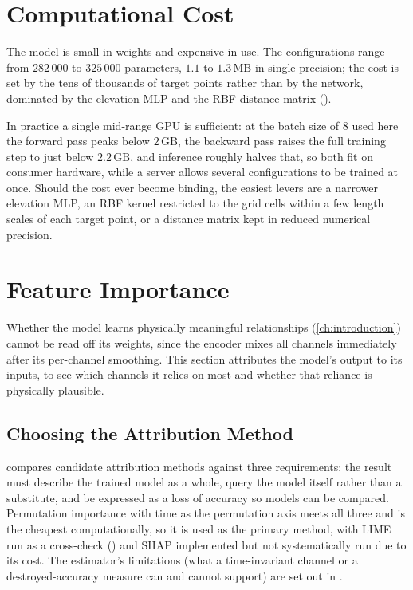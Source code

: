 \section{Computational Cost}\label{sec:meth-cost}

The model is small in weights and expensive in use. The configurations range from $282\,000$ to
$325\,000$ parameters, $1.1$ to $1.3\,\mathrm{MB}$ in single precision; the cost is set by the tens
of thousands of target points rather than by the network, dominated by the elevation MLP and the
RBF distance matrix ().

In practice a single mid-range GPU is sufficient: at the batch size of $8$ used here the forward
pass peaks below $2\,\mathrm{GB}$, the backward pass raises the full training step to just below
$2.2\,\mathrm{GB}$, and inference roughly halves that, so both fit on consumer hardware, while a
server allows several configurations to be trained at once. Should the cost ever become binding,
the easiest levers are a narrower elevation MLP, an RBF kernel restricted to the grid cells within
a few length scales of each target point, or a distance matrix kept in reduced numerical precision.

\section{Feature Importance}\label{sec:meth-fi}

Whether the model learns physically meaningful relationships (\cref{ch:introduction}) cannot be read
off its weights, since the encoder mixes all channels immediately after its per-channel smoothing. This section attributes the model's output to its inputs, to see which channels it relies on most and whether that reliance is physically plausible.

\subsection{Choosing the Attribution Method}\label{subsec:meth-fi-choice}
 compares candidate attribution methods against three requirements: the result must describe the trained model as a whole, query the model itself rather than a substitute, and be expressed as a loss of accuracy so models can be compared. Permutation importance with time as the permutation axis meets all three and is the cheapest computationally, so it is used as the primary method, with LIME run as a cross-check () and SHAP implemented but not systematically run due to its cost. The estimator's limitations (what a time-invariant channel or a destroyed-accuracy measure can and cannot support) are set out in .

